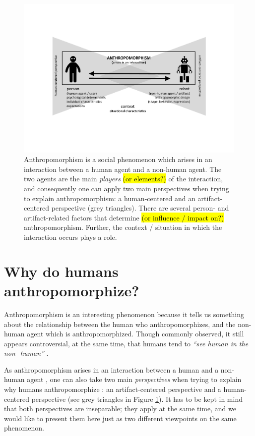 \documentclass{frontiersSCNS} %
\begin{document}
\begin{figure}
    \centering
    \includegraphics[width=0.75\columnwidth]{anthropo.pdf}
    \caption{Anthropomorphism is a social phenomenon which arises in an interaction between a human agent and a non-human agent. The two agents are the main \textit{players} \hl{(or elements?)} of the interaction, and consequently one can apply two main perspectives when trying to explain anthropomorphism: a human-centered and an artifact-centered perspective (grey triangles). There are several person- and artifact-related factors that determine \hl{(or influence / impact on?)} anthropomorphism. Further, the context / situation in which the interaction occurs plays a role.}

    \label{fig:anthropofig}
\end{figure}


%
%
%
%
%
%


\section{Why do humans anthropomorphize?}
\label{sec:anthropomorphism}

Anthropomorphism is an interesting phenomenon because it tells us something about 
the relationship between the human who anthropomorphizes, and the non-human agent 
which is anthropomorphized. Though commonly observed, it still appears controversial, at 
the same time, that humans tend to \textit{``see human in the non-
human''} \citep{epley_seeing_2007}.

As anthropomorphism arises in an interaction between a human and a non-human agent
\citep{persson_anthropomorphism_2000}, one can also
take two main \textit{perspectives} when trying to explain why humans anthropomorphize \citep{lee_human_2005}: an artifact-centered perspective and a human-centered perspective (see grey triangles in Figure \ref{fig:anthropofig}). It has to be kept in mind that both perspectives are inseparable; they apply at the 
same time, and we would like to present them here just as two different viewpoints 
on the same phenomenon.
\end{document}
